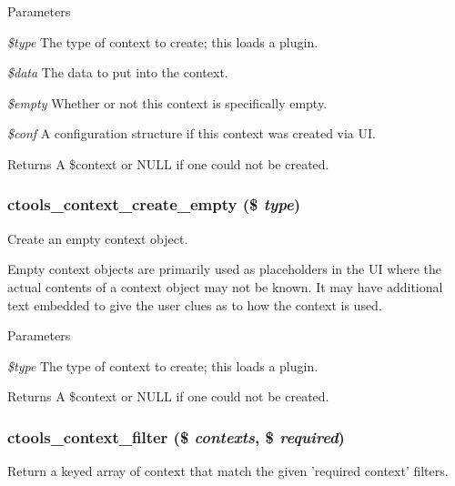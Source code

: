 \begin{DoxyParams}{Parameters}
\item[{\em \$type}]The type of context to create; this loads a plugin. \item[{\em \$data}]The data to put into the context. \item[{\em \$empty}]Whether or not this context is specifically empty. \item[{\em \$conf}]A configuration structure if this context was created via UI.\end{DoxyParams}
\begin{DoxyReturn}{Returns}
A \$context or NULL if one could not be created. 
\end{DoxyReturn}
\hypertarget{context_8inc_ad8ae1df3fc34258a1b45a476782235c7}{
\subsubsection[{ctools\_\-context\_\-create\_\-empty}]{\setlength{\rightskip}{0pt plus 5cm}ctools\_\-context\_\-create\_\-empty (\$ {\em type})}}
\label{context_8inc_ad8ae1df3fc34258a1b45a476782235c7}
Create an empty context object.

Empty context objects are primarily used as placeholders in the UI where the actual contents of a context object may not be known. It may have additional text embedded to give the user clues as to how the context is used.


\begin{DoxyParams}{Parameters}
\item[{\em \$type}]The type of context to create; this loads a plugin.\end{DoxyParams}
\begin{DoxyReturn}{Returns}
A \$context or NULL if one could not be created. 
\end{DoxyReturn}
\hypertarget{context_8inc_aea84f73021272a5ee58e1e41407375a8}{
\subsubsection[{ctools\_\-context\_\-filter}]{\setlength{\rightskip}{0pt plus 5cm}ctools\_\-context\_\-filter (\$ {\em contexts}, \/  \$ {\em required})}}
\label{context_8inc_aea84f73021272a5ee58e1e41407375a8}
Return a keyed array of context that match the given 'required context' filters.

